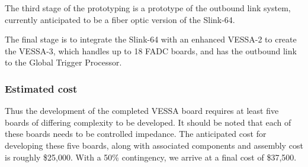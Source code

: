 \documentclass[10pt]{article}
\begin{document}
	The third stage of the prototyping is a prototype of the outbound link system, 
currently anticipated to be a fiber optic version of the Slink-64.

	The final stage is to integrate the Slink-64 with an enhanced VESSA-2 to 
create the VESSA-3, which handles up to 18 FADC boards, and has the outbound link 
to the Global Trigger Processor.

\subsubsection*{Estimated cost}

	Thus the development of the completed VESSA board requires at least five boards 
of differing complexity to be developed.  It should be noted that each of these boards 
needs to be controlled impedance.  The anticipated cost for developing these five boards, 
along with associated components and assembly cost is roughly \$25,000.  With a 50\% 
contingency, we arrive at a final cost of \$37,500.	
\end{document}
